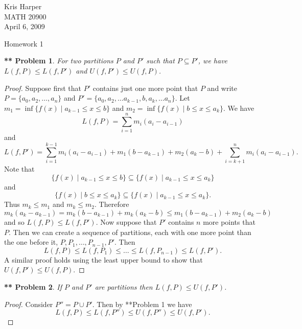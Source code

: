 \documentclass{article}
\newtheorem{**}{** Problem}
\begin{document}
\begin{flushright}
Kris Harper\\

MATH 20900\\

April 6, 2009
\end{flushright}

\begin{center}
Homework 1
\end{center}

\begin{flushleft}

\begin{**}
For two partitions $P$ and $P'$ such that $P \subseteq P'$, we have $L(f,P) \leq L(f,P')$ and $U(f,P') \leq U(f,P)$.
\end{**}
\begin{proof}
Suppose first that $P'$ contains just one more point that $P$ and write $P = \{a_0, a_2, \dots, a_n\}$ and $P' = \{a_0, a_2, \dots a_{k-1}, b, a_k, \dots a_n\}$. Let $m_1 = \inf \{f(x) \mid a_{k-1} \leq x \leq b\}$ and $m_2 = \inf \{f(x) \mid b \leq x \leq a_k\}$. We have
\[
L(f,P) = \sum_{i=1}^{n} m_i (a_i - a_{i-1})
\]
and
\[
L(f,P') = \sum_{i=1}^{k-1} m_i (a_i - a_{i-1}) + m_1 (b-a_{k-1}) + m_2 (a_k-b) + \sum_{i=k+1}^{n} m_i (a_i-a_{i-1}).
\]
Note that
\[
\{f(x) \mid a_{k-1} \leq x \leq b\} \subseteq \{f(x) \mid a_{k-1} \leq x \leq a_k\}
\]
and
\[
\{f(x) \mid b \leq x \leq a_k\} \subseteq \{f(x) \mid a_{k-1} \leq x \leq a_k\}.
\]
Thus $m_k \leq m_1$ and $m_k \leq m_2$. Therefore
\[
m_k (a_k-a_{k-1}) = m_k (b-a_{k-1}) + m_k (a_k-b) \leq m_1 (b-a_{k-1}) + m_2 (a_k-b)
\]
and so $L(f,P) \leq L(f,P')$. Now suppose that $P'$ contains $n$ more points that $P$. Then we can create a sequence of partitions, each with one more point than the one before it, $P, P_1, \dots , P_{n-1}, P'$. Then
\[
L(f,P) \leq L(f,P_1) \leq \dots \leq L(f,P_{n-1}) \leq L(f,P').
\]
A similar proof holds using the least upper bound to show that $U(f,P') \leq U(f,P)$.
\end{proof}

\begin{**}
If $P$ and $P'$ are partitions then $L(f,P) \leq U(f,P')$.
\end{**}
\begin{proof}
Consider $P'' = P \cup P'$. Then by **Problem 1 we have
\[
L(f,P) \leq L(f,P'') \leq U(f,P'') \leq U(f,P').
\]
\end{proof}


\end{flushleft}
\end{document}
